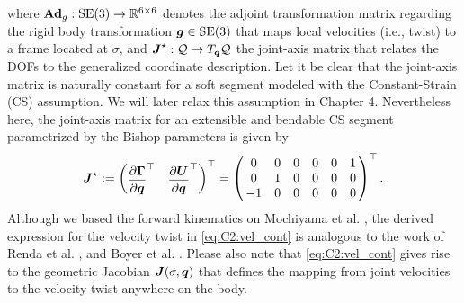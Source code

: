 %
where $\textbf{Ad}_g: \textup{\textrm{SE}}(3) \to \mathbb{R}^{6\times 6}$ denotes the adjoint transformation matrix regarding the rigid body transformation ${\boldsymbol{g}} \in \textup{\textrm{SE}}(3)$ that maps local velocities (i.e., twist) to a frame located at $\sigma$, and ${\boldsymbol{J}}^\star:\mathcal{Q} \to T_{{\boldsymbol{q}}}\mathcal{Q}$ the joint-axis matrix that relates the DOFs to the generalized coordinate description. Let it be clear that the joint-axis matrix is naturally constant for a soft segment modeled with the Constant-Strain (CS) assumption. We will later relax this assumption in Chapter 4. Nevertheless here, the joint-axis matrix for an extensible and bendable CS segment parametrized by the Bishop parameters is given by
%
\begin{align}
\renewcommand*{\arraystretch}{1}{}
\JB^\star := \begin{pmatrix}\dfrac{\p \GammaB}{\p \q}^\top & \dfrac{\p \UB}{\p \q}^\top \end{pmatrix}^\top  = \begin{pmatrix}
\,0 & 0 & 0 & 0 & 0 & 1 \, \\
\,0 & 1 & 0 & 0 & 0 & 0 \,  \\
\,-1 & 0 & 0 & 0 & 0 & 0 \,  \\
\end{pmatrix}^\top. \label{eq:C2:joint-axis-matrix}
\end{align}
%
Although we based the forward kinematics on Mochiyama et al. \cite{Mochiyama2003}, the derived expression for the velocity twist in \eqref{eq:C2:vel_cont} is analogous to the work of Renda et al. \cite{Renda2018,Renda2020}, and Boyer et al. \cite{Boyer2010,Boyer2021}. Please also note that \eqref{eq:C2:vel_cont} gives rise to the geometric Jacobian ${\boldsymbol{J}}(\sigma,{\boldsymbol{q}})$ that defines the mapping from joint velocities to the velocity twist anywhere on the body.

